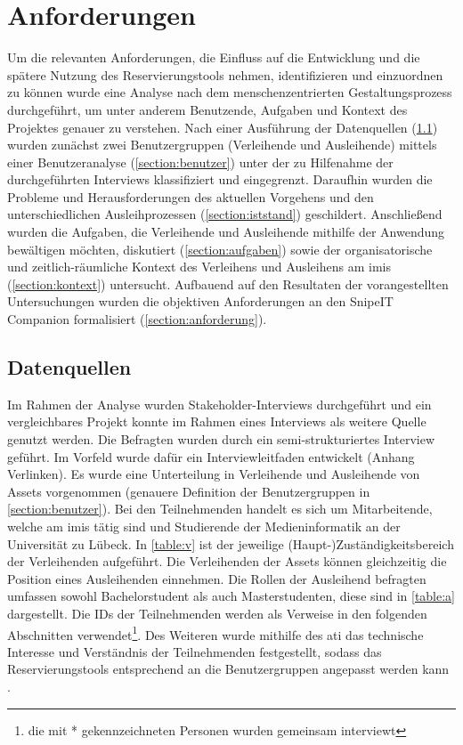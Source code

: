 
\chapter{Anforderungen}
\label{chapter-analyse}

Um die relevanten Anforderungen, die Einfluss auf die Entwicklung und die spätere Nutzung des
Reservierungstools nehmen, identifizieren und einzuordnen zu können wurde eine Analyse nach dem
menschenzentrierten Gestaltungsprozess durchgeführt, um unter anderem Benutzende, Aufgaben und
Kontext des Projektes genauer zu verstehen. Nach einer Ausführung der Datenquellen
(\ref{section:daten}) wurden zunächst zwei Benutzergruppen (Verleihende und Ausleihende) mittels
einer Benutzeranalyse (\ref{section:benutzer}) unter der zu Hilfenahme der durchgeführten Interviews
klassifiziert und eingegrenzt. Daraufhin wurden die Probleme und Herausforderungen des aktuellen
Vorgehens und den unterschiedlichen Ausleihprozessen (\ref{section:iststand}) geschildert.
Anschließend wurden die Aufgaben, die Verleihende und Ausleihende mithilfe der Anwendung bewältigen
möchten, diskutiert (\ref{section:aufgaben}) sowie der organisatorische und zeitlich-räumliche
Kontext des Verleihens und Ausleihens am \ac{imis} (\ref{section:kontext}) untersucht. Aufbauend auf
den Resultaten der vorangestellten Untersuchungen wurden die objektiven Anforderungen an den SnipeIT
Companion formalisiert (\ref{section:anforderung}).

\section{Datenquellen}
\label{section:daten}
Im Rahmen der Analyse wurden Stakeholder-Interviews durchgeführt und ein vergleichbares Projekt
konnte im Rahmen eines Interviews als weitere Quelle genutzt werden. Die Befragten wurden durch ein
semi-strukturiertes Interview geführt. Im Vorfeld wurde dafür ein Interviewleitfaden entwickelt
(Anhang Verlinken). Es wurde eine Unterteilung in Verleihende und Ausleihende von Assets vorgenommen
(genauere Definition der Benutzergruppen in \ref{section:benutzer}). Bei den Teilnehmenden handelt
es sich um Mitarbeitende, welche am \ac{imis} tätig sind und Studierende der Medieninformatik an der
Universität zu Lübeck. In \ref{table:v} ist der jeweilige (Haupt-)Zuständigkeitsbereich der
Verleihenden aufgeführt. Die Verleihenden der Assets können gleichzeitig die Position eines
Ausleihenden einnehmen. Die Rollen der Ausleihend befragten umfassen sowohl Bachelorstudent als auch
Masterstudenten, diese sind in \ref{table:a} dargestellt. Die IDs der Teilnehmenden werden als
Verweise in den folgenden Abschnitten verwendet\footnote{die mit * gekennzeichneten Personen wurden
gemeinsam interviewt}. Des Weiteren wurde mithilfe des \ac{ati} das technische Interesse und
Verständnis der Teilnehmenden festgestellt, sodass das Reservierungstools entsprechend an die
Benutzergruppen angepasst werden kann \cite{attig_assessing_2017}.


